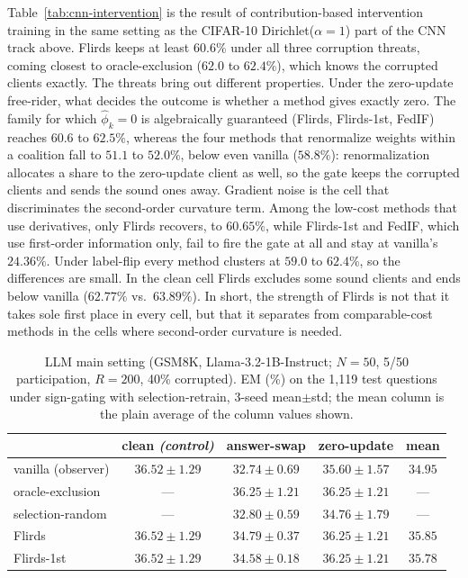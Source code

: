 \documentclass[letterpaper]{article} %
\theoremstyle{definition} %
\begin{document}
Table~\ref{tab:cnn-intervention} is the result of contribution-based
intervention training in the same setting as the CIFAR-10 Dirichlet($\alpha{=}1$)
part of the CNN track above. Flirds keeps at least $60.6\%$ under all three
corruption threats, coming closest to oracle-exclusion ($62.0$ to $62.4\%$),
which knows the corrupted clients exactly. The threats bring out different
properties. Under the zero-update free-rider, what decides the outcome is
whether a method gives exactly zero. The family for which $\hat\phi_k = 0$ is
algebraically guaranteed (Flirds, Flirds-1st, FedIF) reaches $60.6$ to
$62.5\%$, whereas the four methods that renormalize weights within a
coalition fall to $51.1$ to $52.0\%$, below even vanilla ($58.8\%$):
renormalization allocates a share to the zero-update client as well, so the
gate keeps the corrupted clients and sends the sound ones away. Gradient
noise is the cell that discriminates the second-order curvature term. Among
the low-cost methods that use derivatives, only Flirds recovers, to
$60.65\%$, while Flirds-1st and FedIF, which use first-order information
only, fail to fire the gate at all and stay at vanilla's $24.36\%$. Under
label-flip every method clusters at $59.0$ to $62.4\%$, so the differences
are small. In the clean cell Flirds excludes some sound clients and ends
below vanilla ($62.77\%$ vs.\ $63.89\%$). In short, the strength of Flirds is
not that it takes sole first place in every cell, but that it separates from
comparable-cost methods in the cells where second-order curvature is needed.

\begin{table}[t]
\centering
\small
\setlength{\tabcolsep}{4pt}
\caption{LLM main setting (GSM8K, Llama-3.2-1B-Instruct; $N{=}50$, 5/50
participation, $R{=}200$, 40\% corrupted). EM (\%) on the 1{,}119 test
questions under sign-gating with selection-retrain, 3-seed mean$\pm$std; the
mean column is the plain average of the column values shown.}
\label{tab:llm-intervention}
\begin{tabular}{lcccc}
\hline
 & clean \emph{(control)} & answer-swap & zero-update & mean \\
\hline
vanilla (observer) & $36.52\pm1.29$ & $32.74\pm0.69$ & $35.60\pm1.57$ & $34.95$ \\
oracle-exclusion & --- & $36.25\pm1.21$ & $36.25\pm1.21$ & --- \\
selection-random & --- & $32.80\pm0.59$ & $34.76\pm1.79$ & --- \\
Flirds & $36.52\pm1.29$ & $34.79\pm0.37$ & $36.25\pm1.21$ & $35.85$ \\
Flirds-1st & $36.52\pm1.29$ & $34.58\pm0.18$ & $36.25\pm1.21$ & $35.78$ \\
\hline
\end{tabular}
\end{table}
\end{document}
